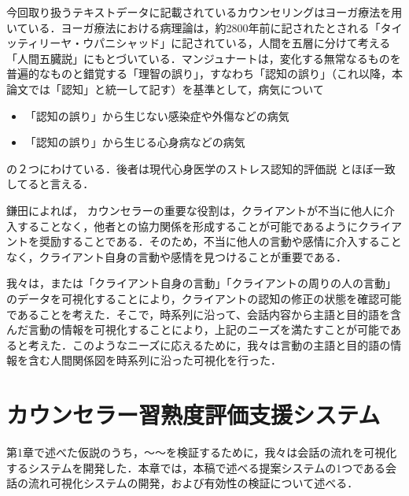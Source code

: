 \documentclass[shuuron]{kuee}
\begin{document}
今回取り扱うテキストデータに記載されているカウンセリングはヨーガ療法を用いている．ヨーガ療法における病理論は，約2800年前に記されたとされる「タイッティリーヤ・ウパニシャッド」に記されている，人間を五層に分けて考える「人間五臓説」にもとづいている\cite{kimura}．マンジュナート\cite{manjunath}は，変化する無常なるものを普遍的なものと錯覚する「理智の誤り」，すなわち「認知の誤り」（これ以降，本論文では「認知」と統一して記す）を基準として，病気について
\begin{itemize}
  \item 「認知の誤り」から生じない感染症や外傷などの病気
  \item 「認知の誤り」から生じる心身病などの病気
\end{itemize}
の２つにわけている．後者は現代心身医学のストレス認知的評価説
\cite{Lazarus}とほぼ一致してると言える\cite{Darshana}．


鎌田\cite{kamata2002}によれば， カウンセラーの重要な役割は，クライアントが不当に他人に介入することなく，他者との協力関係を形成することが可能であるようにクライアントを奨励することである．そのため，不当に他人の言動や感情に介入することなく，クライアント自身の言動や感情を見つけることが重要である．


我々は，または「クライアント自身の言動」「クライアントの周りの人の言動」のデータを可視化することにより，クライアントの認知の修正の状態を確認可能であることを考えた．そこで，時系列に沿って、会話内容から主語と目的語を含んだ言動の情報を可視化することにより，上記のニーズを満たすことが可能であると考えた．このようなニーズに応えるために，我々は言動の主語と目的語の情報を含む人間関係図を時系列に沿った可視化を行った．



\chapter{カウンセラー習熟度評価支援システム}





第1章で述べた仮説のうち，〜〜を検証するために，我々は会話の流れを可視化するシステムを開発した．本章では，本稿で述べる提案システムの1つである会話の流れ可視化システムの開発，および有効性の検証について述べる．
\end{document}
